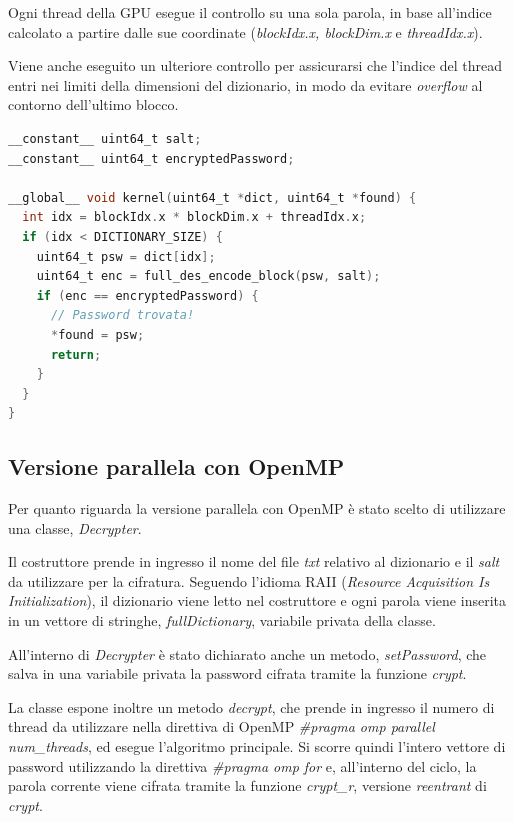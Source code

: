 \documentclass[10pt,twocolumn,letterpaper]{article}
\begin{document}
Ogni thread della GPU esegue il controllo su una sola parola, in base all'indice calcolato a partire dalle sue coordinate (\textit{blockIdx.x, blockDim.x} e \textit{threadIdx.x}).

Viene anche eseguito un ulteriore controllo per assicurarsi che l'indice del thread entri nei limiti della dimensioni del dizionario, in modo da evitare \textit{overflow} al contorno dell'ultimo blocco.\newline


\begin{lstlisting}[basicstyle=\scriptsize, language=C, frame=single, caption={Esempio di kernel in CUDA},captionpos=b]
__constant__ uint64_t salt;
__constant__ uint64_t encryptedPassword;

__global__ void kernel(uint64_t *dict, uint64_t *found) {
  int idx = blockIdx.x * blockDim.x + threadIdx.x;
  if (idx < DICTIONARY_SIZE) {
    uint64_t psw = dict[idx];
    uint64_t enc = full_des_encode_block(psw, salt);
    if (enc == encryptedPassword) {
      // Password trovata!
      *found = psw;
      return;
    }
  }
}
\end{lstlisting}

\subsection{Versione parallela con OpenMP}
Per quanto riguarda la versione parallela con OpenMP è stato scelto di utilizzare una classe, \textit{Decrypter}.

Il costruttore prende in ingresso il nome del file \textit{txt} relativo al dizionario e il \textit{salt} da utilizzare per la cifratura. Seguendo l'idioma RAII (\textit{Resource Acquisition Is Initialization}), il dizionario viene letto nel costruttore e ogni parola viene inserita in un vettore di stringhe, \textit{fullDictionary}, variabile privata della classe.

All'interno di \textit{Decrypter} è stato dichiarato anche un metodo, \textit{setPassword}, che salva in una variabile privata la password cifrata tramite la funzione \textit{crypt}. 

La classe espone inoltre un metodo \textit{decrypt}, che prende in ingresso il numero di thread da utilizzare nella direttiva di OpenMP \textit{\#pragma omp parallel num\_threads}, ed esegue l'algoritmo principale. Si scorre quindi l'intero vettore di password utilizzando la direttiva \textit{\#pragma omp for} e, all'interno del ciclo, la parola corrente viene cifrata tramite la funzione \textit{crypt\_r}, versione \textit{reentrant} di \textit{crypt}.
\end{document}
